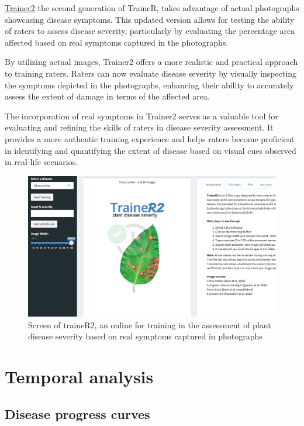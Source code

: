 \documentclass[
  letterpaper,
  DIV=11,
  numbers=noendperiod]{scrreprt}
\begin{document}
\href{https://delponte.shinyapps.io/traineR2/}{Trainer2} the second
generation of TraineR, takes advantage of actual photographs showcasing
disease symptoms. This updated version allows for testing the ability of
raters to assess disease severity, particularly by evaluating the
percentage area affected based on real symptoms captured in the
photographs.

By utilizing actual images, Trainer2 offers a more realistic and
practical approach to training raters. Raters can now evaluate disease
severity by visually inspecting the symptoms depicted in the
photographs, enhancing their ability to accurately assess the extent of
damage in terms of the affected area.

The incorporation of real symptoms in Trainer2 serves as a valuable tool
for evaluating and refining the skills of raters in disease severity
assessment. It provides a more authentic training experience and helps
raters become proficient in identifying and quantifying the extent of
disease based on visual cues observed in real-life scenarios.

\begin{figure}

{\centering \includegraphics[width=4.47917in,height=\textheight]{imgs/trainer2.png}

}

\caption{\label{fig-trainer2}Screen of traineR2, an online for training
in the assessment of plant disease severity based on real symptoms
captured in photographs}

\end{figure}

\part{Temporal analysis}

\hypertarget{disease-progress-curves}{%
\chapter{Disease progress curves}\label{disease-progress-curves}}
\end{document}
